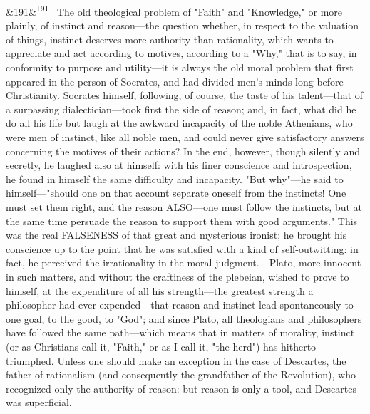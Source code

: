 \documentclass[12pt]{article}
\newcommand{\para}[1][]{\par\noindent\ifx&#1&\else\textsuperscript{\footnotesize #1}~\fi}
\begin{document}
\para[191] The old theological problem of "Faith" and "Knowledge," or more plainly, of instinct and reason---the question whether, in respect to the valuation of things, instinct deserves more authority than rationality, which wants to appreciate and act according to motives, according to a "Why," that is to say, in conformity to purpose and utility---it is always the old moral problem that first appeared in the person of Socrates, and had divided men's minds long before Christianity. Socrates himself, following, of course, the taste of his talent---that of a surpassing dialectician---took first the side of reason; and, in fact, what did he do all his life but laugh at the awkward incapacity of the noble Athenians, who were men of instinct, like all noble men, and could never give satisfactory answers concerning the motives of their actions? In the end, however, though silently and secretly, he laughed also at himself: with his finer conscience and introspection, he found in himself the same difficulty and incapacity. "But why"---he said to himself---"should one on that account separate oneself from the instincts! One must set them right, and the reason ALSO---one must follow the instincts, but at the same time persuade the reason to support them with good arguments." This was the real FALSENESS of that great and mysterious ironist; he brought his conscience up to the point that he was satisfied with a kind of self-outwitting: in fact, he perceived the irrationality in the moral judgment.---Plato, more innocent in such matters, and without the craftiness of the plebeian, wished to prove to himself, at the expenditure of all his strength---the greatest strength a philosopher had ever expended---that reason and instinct lead spontaneously to one goal, to the good, to "God"; and since Plato, all theologians and philosophers have followed the same path---which means that in matters of morality, instinct (or as Christians call it, "Faith," or as I call it, "the herd") has hitherto triumphed. Unless one should make an exception in the case of Descartes, the father of rationalism (and consequently the grandfather of the Revolution), who recognized only the authority of reason: but reason is only a tool, and Descartes was superficial.
\end{document}

